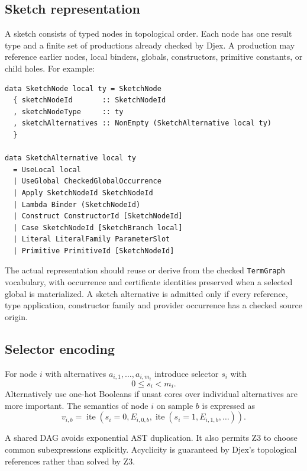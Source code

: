 \documentclass[11pt,oneside]{report}
\newcommand{\code}[1]{\texttt{#1}}
\begin{document}
\subsection{Sketch representation}

A sketch consists of typed nodes in topological order. Each node has one result type and a finite set of productions already checked by Djex. A production may reference earlier nodes, local binders, globals, constructors, primitive constants, or child holes. For example:

\begin{lstlisting}[language=HaskellX,caption={Conceptual typed selector-DAG representation.},label={lst:sketch-dag}]
data SketchNode local ty = SketchNode
  { sketchNodeId       :: SketchNodeId
  , sketchNodeType     :: ty
  , sketchAlternatives :: NonEmpty (SketchAlternative local ty)
  }

data SketchAlternative local ty
  = UseLocal local
  | UseGlobal CheckedGlobalOccurrence
  | Apply SketchNodeId SketchNodeId
  | Lambda Binder (SketchNodeId)
  | Construct ConstructorId [SketchNodeId]
  | Case SketchNodeId [SketchBranch local]
  | Literal LiteralFamily ParameterSlot
  | Primitive PrimitiveId [SketchNodeId]
\end{lstlisting}

The actual representation should reuse or derive from the checked \code{TermGraph} vocabulary, with occurrence and certificate identities preserved when a selected global is materialized. A sketch alternative is admitted only if every reference, type application, constructor family and provider occurrence has a checked source origin.

\subsection{Selector encoding}

For node $i$ with alternatives $a_{i,1},\ldots,a_{i,m_i}$ introduce selector $s_i$ with
\[
  0 \le s_i < m_i.
\]
Alternatively use one-hot Booleans if unsat cores over individual alternatives are more important. The semantics of node $i$ on sample $b$ is expressed as
\[
  v_{i,b} = \operatorname{ite}(s_i=0,E_{i,0,b},
                \operatorname{ite}(s_i=1,E_{i,1,b},\ldots)).
\]

A shared DAG avoids exponential AST duplication. It also permits Z3 to choose common subexpressions explicitly. Acyclicity is guaranteed by Djex's topological references rather than solved by Z3.
\end{document}
